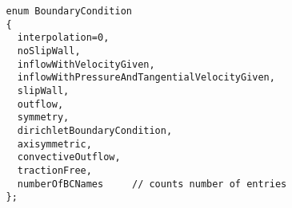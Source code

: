  {\footnotesize
 \begin{verbatim}
   enum BoundaryCondition
   {
     interpolation=0,
     noSlipWall,
     inflowWithVelocityGiven,
     inflowWithPressureAndTangentialVelocityGiven,
     slipWall,
     outflow,
     symmetry,
     dirichletBoundaryCondition,
     axisymmetric,
     convectiveOutflow,
     tractionFree,
     numberOfBCNames     // counts number of entries
   };
 \end{verbatim}
 }
